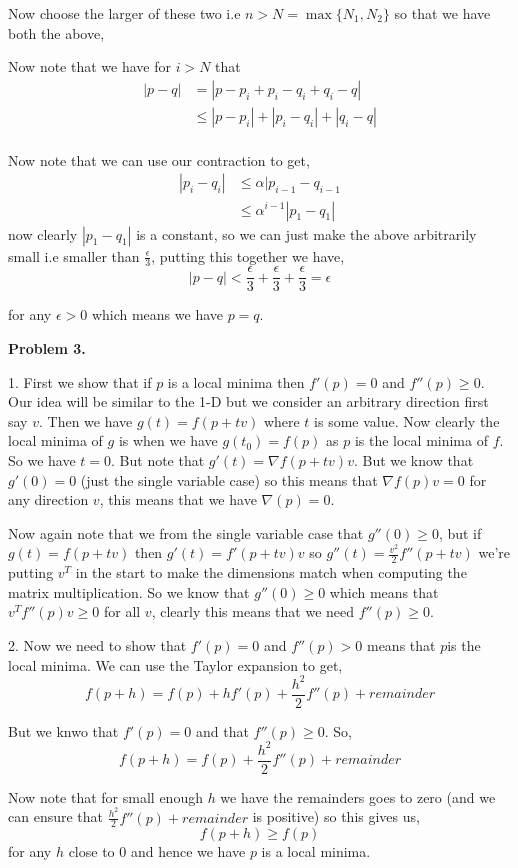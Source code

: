 \documentclass[a4paper]{article}
\begin{document}
Now choose the larger of these two i.e $n > N = \max \{N_{1}, N_{2}\}$ so that we have both the above,

\vspace{1em}

Now note that we have for $i > N$ that
\begin{align*}
  |p - q| &= |p - p_i + p_i - q_i + q_i - q|\\
          &\le  |p - p_i | +|p_i - q_i| + |q_i - q|\\
\end{align*}

Now note that we can use our contraction to get, 
\begin{align*}
  |p_i - q_i| &\le \alpha |p_{i - 1} - q_{i - 1}\\
              &\le \alpha^{i - 1} |p_{1} - q_{1}|
\end{align*}
now clearly $|p_{1} - q_{1}|$ is a constant, so we can just make the above  arbitrarily small i.e smaller than $\frac{\epsilon}{3}$, putting this together we have, 
\[
  |p - q| < \frac{\epsilon}{3} +  \frac{\epsilon}{3} +  \frac{\epsilon}{3} = \epsilon
\]

for any $\epsilon > 0$ which means we have $p = q$.







\textbf{Problem 3.}

1. First we show that if $p$ is a local minima then $f'(p) = 0$ and $f''(p) \ge 0$. Our idea will be similar to the 1-D but we consider an arbitrary direction first say $v$. Then we have $g(t) = f(p + tv)$ where $t$ is some value. Now clearly the local minima of $g$ is when we have $g(t_{0}) = f(p)$ as $p$ is the local minima of $f$.  So we have $t = 0$. But note that $g'(t) = \nabla f(p + tv) v$. But we know that $g'(0) = 0$ (just the single variable case) so this means that $\nabla f(p)  v = 0$ for any direction $v$, this means that we have $\nabla (p) =0$.

\vspace{1em}

Now again note that we from the single variable case that $g''(0) \ge 0$, but if $g(t) = f(p + tv)$ then $g'(t) = f'(p + tv) v$ so $g''(t) = \frac{v^2}{2} f''(p + tv) $ we're putting $v^{T}$ in the start to make the dimensions match when computing the matrix multiplication. So we know that $g''(0) \ge 0$ which means that $v^{T} f''(p) v \ge 0$ for all $v$, clearly this means that we need $f''(p) \ge 0$.

\vspace{1em}

2.  Now we need to show that $f'(p) = 0$ and $f''(p) > 0$ means that $p$is the local minima. We can use the Taylor expansion to get, 
\[
    f(p + h) = f(p) + h f'(p) + \frac{h^2}{2} f''(p) + remainder
\]

But we knwo that $f'(p) = 0$ and that $f''(p) \ge 0$. So, 
\[
    f(p + h) = f(p) + \frac{h^2}{2} f''(p) + remainder 
\]

Now note that for small enough $h$ we have the remainders goes to zero (and we can ensure that $\frac{h^2}{2} f''(p) + remainder$ is positive) so this gives us, 
\[
    f(p + h) \ge f(p)
\]
for any $h$ close to $0$ and hence we have $p$ is a local minima.
    
\end{document}
